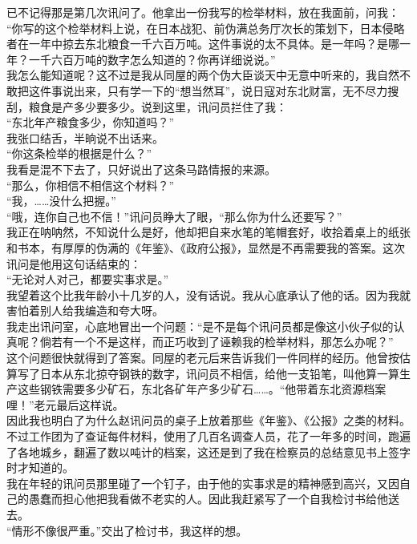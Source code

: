 已不记得那是第几次讯问了。他拿出一份我写的检举材料，放在我面前，问我：\\

“你写的这个检举材料上说，在日本战犯、前伪满总务厅次长的策划下，日本侵略者在一年中掠去东北粮食一千六百万吨。这件事说的太不具体。是一年吗？是哪一年？一千六百万吨的数字怎么知道的？你再详细说说。”\\

我怎么能知道呢？这不过是我从同屋的两个伪大臣谈天中无意中听来的，我自然不敢把这件事说出来，只有学一下的“想当然耳”，说日寇对东北财富，无不尽力搜刮，粮食是产多少要多少。说到这里，讯问员拦住了我：\\

“东北年产粮食多少，你知道吗？”\\

我张口结舌，半晌说不出话来。\\

“你这条检举的根据是什么？”\\

我看是混不下去了，只好说出了这条马路情报的来源。\\

“那么，你相信不相信这个材料？”\\

“我，……没什么把握。”\\

“哦，连你自己也不信！”讯问员睁大了眼，“那么你为什么还要写？”\\

我正在呐呐然，不知说什么是好，他却把自来水笔的笔帽套好，收拾着桌上的纸张和书本，有厚厚的伪满的《年鉴》、《政府公报》，显然是不再需要我的答案。这次讯问是他用这句话结束的：\\

“无论对人对己，都要实事求是。”\\

我望着这个比我年龄小十几岁的人，没有话说。我从心底承认了他的话。因为我就害怕着别人给我编造和夸大呀。\\

我走出讯问室，心底地冒出一个问题：“是不是每个讯问员都是像这小伙子似的认真呢？倘若有一个不是这样，而正巧收到了诬赖我的检举材料，那怎么办呢？”\\

这个问题很快就得到了答案。同屋的老元后来告诉我们一件同样的经历。他曾按估算写了日本从东北掠夺钢铁的数字，讯问员不相信，给他一支铅笔，叫他算一算生产这些钢铁需要多少矿石，东北各矿年产多少矿石……。“他带着东北资源档案哩！”老元最后这样说。\\

因此我也明白了为什么赵讯问员的桌子上放着那些《年鉴》、《公报》之类的材料。不过工作团为了查证每件材料，使用了几百名调查人员，花了一年多的时间，跑遍了各地城乡，翻遍了数以吨计的档案，这还是到了我在检察员的总结意见书上签字时才知道的。\\

我在年轻的讯问员那里碰了一个钉子，由于他的实事求是的精神感到高兴，又因自己的愚蠢而担心他把我看做不老实的人。因此我赶紧写了一个自我检讨书给他送去。\\

“情形不像很严重。”交出了检讨书，我这样的想。
